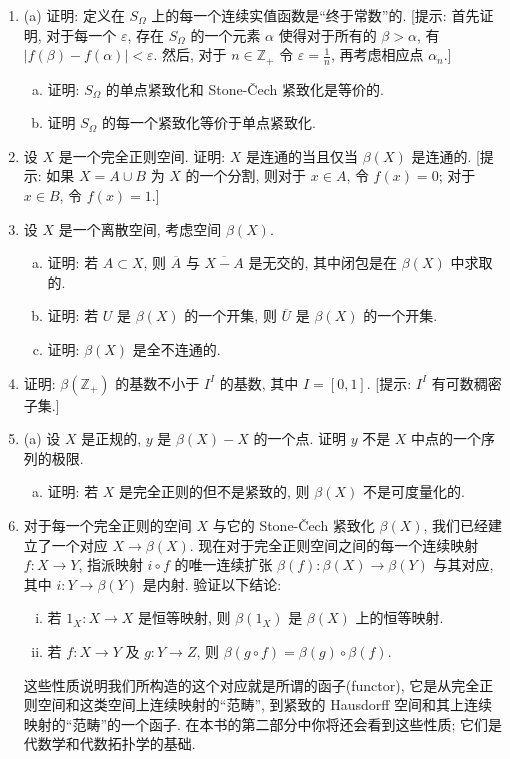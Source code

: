 \documentclass[../../main.tex]{subfiles}
\begin{document}
\begin{enumerate}
\item (a) 证明: 定义在 $S_\Omega$ 上的每一个连续实值函数是``终于常数''的. [提示: 首先证明, 对于每一个 $\varepsilon$, 存在 $S_\Omega$ 的一个元素 $\alpha$ 使得对于所有的 $\beta>\alpha$, 有 $|f(\beta)-f(\alpha)|<\varepsilon$. 然后, 对于 $n\in\mathbb{Z}_+$ 令 $\varepsilon=\tfrac1n$, 再考虑相应点 $\alpha_n$.]
\begin{enumerate}[(b)]
\item 证明: $S_\Omega$ 的单点紧致化和 Stone-Čech 紧致化是等价的.
\item 证明 $S_\Omega$ 的每一个紧致化等价于单点紧致化.
\end{enumerate}
\item 设 $X$ 是一个完全正则空间. 证明: $X$ 是连通的当且仅当 $\beta(X)$ 是连通的. [提示: 如果 $X=A\cup B$ 为 $X$ 的一个分割, 则对于 $x\in A$, 令 $f(x)=0$; 对于 $x\in B$, 令 $f(x)=1$.]
\item 设 $X$ 是一个离散空间, 考虑空间 $\beta(X)$.
\begin{enumerate}[(a)]
\item 证明: 若 $A\subset X$, 则 $\overline{A}$ 与 $\overline{X-A}$ 是无交的, 其中闭包是在 $\beta(X)$ 中求取的.
\item 证明: 若 $U$ 是 $\beta(X)$ 的一个开集, 则 $\overline{U}$ 是 $\beta(X)$ 的一个开集.
\item 证明: $\beta(X)$ 是全不连通的.
\end{enumerate}
\item 证明: $\beta(\mathbb{Z}_+)$ 的基数不小于 $I^I$ 的基数, 其中 $I=[0,1]$. [提示: $I^I$ 有可数稠密子集.]
\item (a) 设 $X$ 是正规的, $y$ 是 $\beta(X)-X$ 的一个点. 证明 $y$ 不是 $X$ 中点的一个序列的极限.
\begin{enumerate}[(b)]
\item 证明: 若 $X$ 是完全正则的但不是紧致的, 则 $\beta(X)$ 不是可度量化的.
\end{enumerate}
\item 对于每一个完全正则的空间 $X$ 与它的 Stone-Čech 紧致化 $\beta(X)$, 我们已经建立了一个对应 $X\to\beta(X)$. 现在对于完全正则空间之间的每一个连续映射 $f\colon X\to Y$, 指派映射 $i\circ f$ 的唯一连续扩张 $\beta(f)\colon\beta(X)\to\beta(Y)$ 与其对应, 其中 $i\colon Y\to\beta(Y)$ 是内射. 验证以下结论:
\begin{enumerate}[(i)]
\item 若 $1_X\colon X\to X$ 是恒等映射, 则 $\beta(1_X)$ 是 $\beta(X)$ 上的恒等映射.
\item 若 $f\colon X\to Y$ 及 $g\colon Y\to Z$, 则 $\beta(g\circ f)=\beta(g)\circ\beta(f)$.
\end{enumerate}
这些性质说明我们所构造的这个对应就是所谓的函子(functor), 它是从完全正则空间和这类空间上连续映射的``范畴'', 到紧致的 Hausdorff 空间和其上连续映射的``范畴''的一个函子. 在本书的第二部分中你将还会看到这些性质; 它们是代数学和代数拓扑学的基础.
\end{enumerate}
\end{document}
